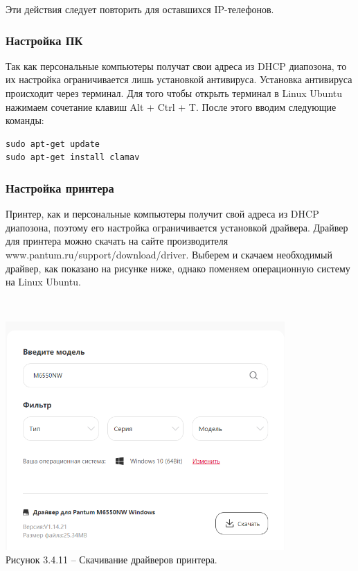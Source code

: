     Эти действия следует повторить для оставшихся IP-телефонов.

    \subsubsection{Настройка ПК}
    Так как персональные компьютеры получат свои адреса из DHCP диапозона,
    то их настройка ограничивается лишь установкой антивируса.
    Установка антивируса происходит через терминал.
    Для того чтобы открыть терминал в Linux Ubuntu нажимаем сочетание клавиш Alt + Ctrl + T.
    После этого вводим следующие команды:
\begin{lstlisting}
sudo apt-get update
sudo apt-get install clamav
\end{lstlisting}

    \subsubsection{Настройка принтера}
Принтер, как и персональные компьютеры получит свой адреса из DHCP диапозона,
поэтому его настройка ограничивается установкой драйвера.
Драйвер для принтера можно скачать на сайте производителя www.pantum.ru/support/download/driver.
Выберем и скачаем необходимый драйвер, как показано на рисунке ниже, однако поменяем операционную систему на Linux Ubuntu.

    \\
    \begin{center}
        \includegraphics[width=0.8\textwidth]{images/printerdriver}\\
        Рисунок 3.4.11 – Скачивание драйверов принтера.
    \end{center}
    \\

